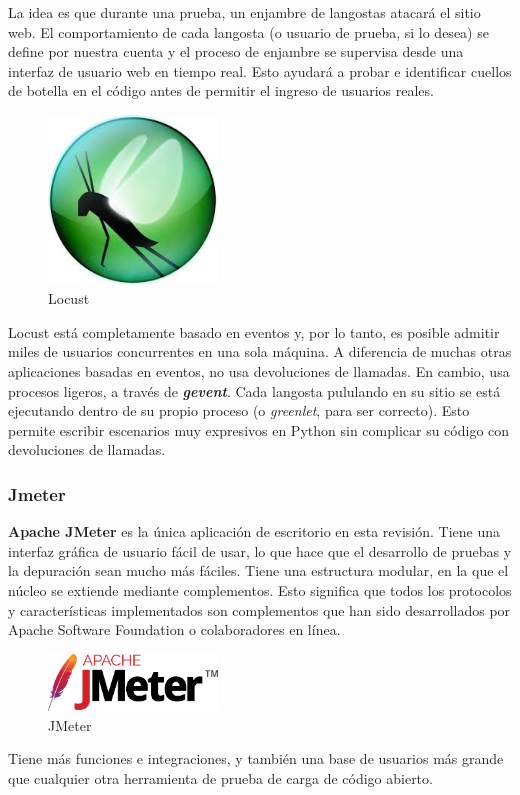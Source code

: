La idea es que durante una prueba, un enjambre de langostas atacará el sitio web. El comportamiento de cada langosta (o usuario de prueba, si lo desea) se define por nuestra cuenta y el proceso de enjambre se supervisa desde una interfaz de usuario web en tiempo real. Esto ayudará a probar e identificar cuellos de botella en el código antes de permitir el ingreso de usuarios reales.
\begin{figure}[H]
	\centering
	\includegraphics[width=0.4\textwidth]{imagenes/carga/locust.jpeg}
	\caption{Locust} \label{locust}
\end{figure}
Locust está completamente basado en eventos y, por lo tanto, es posible admitir miles de usuarios concurrentes en una sola máquina. A diferencia de muchas otras aplicaciones basadas en eventos, no usa devoluciones de llamadas. En cambio, usa procesos ligeros, a través de \textit{\textbf{gevent}}. Cada langosta pululando en su sitio se está ejecutando dentro de su propio proceso (o \textit{greenlet}, para ser correcto). Esto permite escribir escenarios muy expresivos en Python sin complicar su código con devoluciones de llamadas.
\newpage
\subsubsection{Jmeter}
\textbf{Apache JMeter} \cite{jmeter} es la única aplicación de escritorio en esta revisión. Tiene una interfaz gráfica de usuario fácil de usar, lo que hace que el desarrollo de pruebas y la depuración sean mucho más fáciles. Tiene una estructura modular, en la que el núcleo se extiende mediante complementos. Esto significa que todos los protocolos y características implementados son complementos que han sido desarrollados por Apache Software Foundation o colaboradores en línea.
\begin{figure}[H]
	\centering
	\includegraphics[width=0.4\textwidth]{imagenes/carga/jmeter.png}
	\caption{JMeter} \label{jmeter}
\end{figure}
Tiene más funciones e integraciones, y también una base de usuarios más grande que cualquier otra herramienta de prueba de carga de código abierto.

